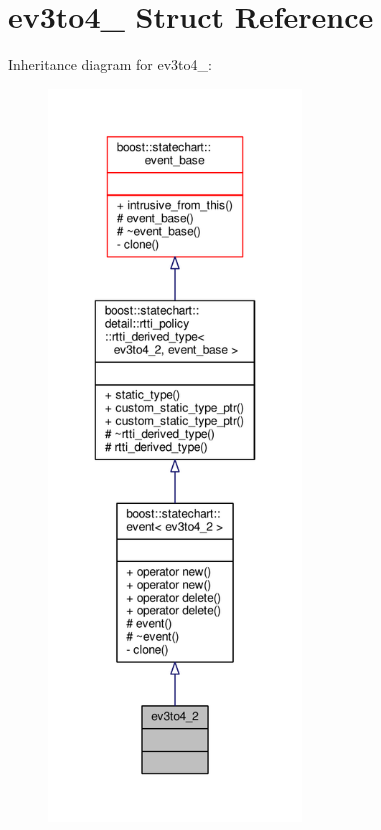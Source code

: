 \hypertarget{structev3to4__2}{}\section{ev3to4\+\_ Struct Reference}
\label{structev3to4__2}


Inheritance diagram for ev3to4\+\_\+:
\nopagebreak
\begin{figure}[H]
\begin{center}
\leavevmode
\includegraphics[height=550pt]{structev3to4__2__inherit__graph}
\end{center}
\end{figure}


